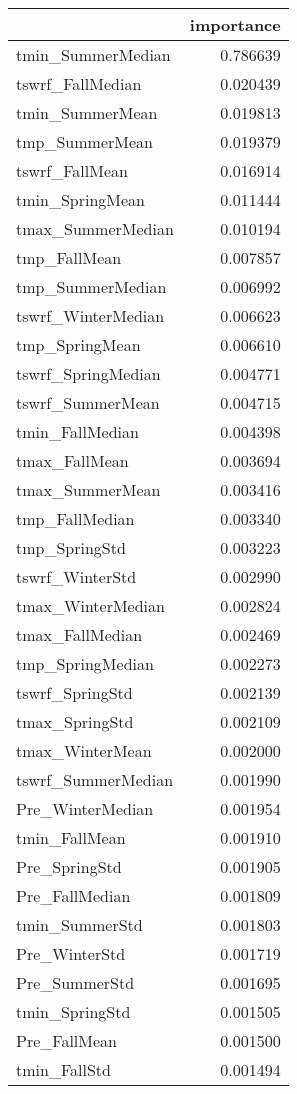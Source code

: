 \begin{tabular}{lr}
\toprule
 & importance \\
\midrule
tmin_SummerMedian & 0.786639 \\
tswrf_FallMedian & 0.020439 \\
tmin_SummerMean & 0.019813 \\
tmp_SummerMean & 0.019379 \\
tswrf_FallMean & 0.016914 \\
tmin_SpringMean & 0.011444 \\
tmax_SummerMedian & 0.010194 \\
tmp_FallMean & 0.007857 \\
tmp_SummerMedian & 0.006992 \\
tswrf_WinterMedian & 0.006623 \\
tmp_SpringMean & 0.006610 \\
tswrf_SpringMedian & 0.004771 \\
tswrf_SummerMean & 0.004715 \\
tmin_FallMedian & 0.004398 \\
tmax_FallMean & 0.003694 \\
tmax_SummerMean & 0.003416 \\
tmp_FallMedian & 0.003340 \\
tmp_SpringStd & 0.003223 \\
tswrf_WinterStd & 0.002990 \\
tmax_WinterMedian & 0.002824 \\
tmax_FallMedian & 0.002469 \\
tmp_SpringMedian & 0.002273 \\
tswrf_SpringStd & 0.002139 \\
tmax_SpringStd & 0.002109 \\
tmax_WinterMean & 0.002000 \\
tswrf_SummerMedian & 0.001990 \\
Pre_WinterMedian & 0.001954 \\
tmin_FallMean & 0.001910 \\
Pre_SpringStd & 0.001905 \\
Pre_FallMedian & 0.001809 \\
tmin_SummerStd & 0.001803 \\
Pre_WinterStd & 0.001719 \\
Pre_SummerStd & 0.001695 \\
tmin_SpringStd & 0.001505 \\
Pre_FallMean & 0.001500 \\
tmin_FallStd & 0.001494 \\

\end{tabular}

